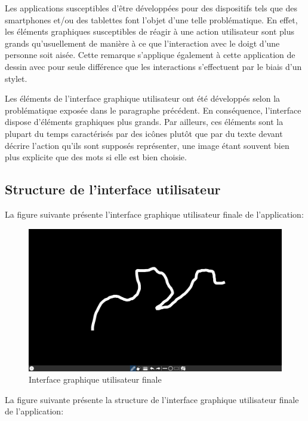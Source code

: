 \documentclass[11pt,a4paper,oldfontcommands]{memoir}
\begin{document}
Les applications susceptibles d'être développées pour des dispositifs tels que des smartphones et/ou des tablettes font l'objet d'une telle problématique. En effet, les éléments graphiques susceptibles de réagir à une action utilisateur sont plus grands qu'usuellement de manière à ce que l'interaction avec le doigt d'une personne soit aisée. Cette remarque s'applique également à cette application de dessin avec pour seule différence que les interactions s'effectuent par le biais d'un stylet.

Les éléments de l'interface graphique utilisateur ont été développés selon la problématique exposée dans le paragraphe précédent. En conséquence, l'interface dispose d'éléments graphiques plus grands. Par ailleurs, ces éléments sont la plupart du temps caractérisés par des icônes plutôt que par du texte devant décrire l'action qu'ils sont supposés représenter, une image étant souvent bien plus explicite que des mots si elle est bien choisie.

\subsection{Structure de l'interface utilisateur}

La figure suivante présente l'interface graphique utilisateur finale de l'application:

\begin{figure}[H]
\centering
\includegraphics[scale=0.4]{images/ui-final.png}
\caption{Interface graphique utilisateur finale}
\end{figure}

La figure suivante présente la structure de l'interface graphique utilisateur finale de l'application:
\end{document}
